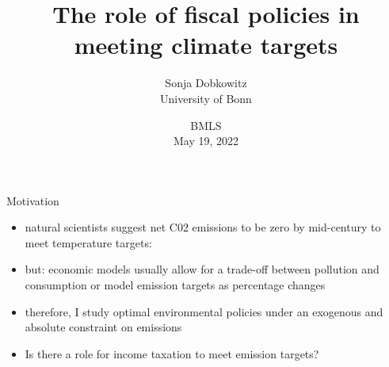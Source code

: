 \documentclass[11pt,aspectratio=169]{beamer}
\author[Sonja Dobkowitz]{\small Sonja Dobkowitz\\ \footnotesize{University of Bonn%
	}\\ }
\institute[University of Bonn]{}
\title{The role of fiscal policies in meeting climate targets}
\date{\small{BMLS\\ May 19, 2022 }}
\newcommand{\ar}{$\Rightarrow$ \ }
\begin{document}
	
	{
		\begin{frame}
		\titlepage
	\end{frame}
}



\begin{frame}{Motivation}

\begin{itemize}[<+-| alert@+>]
\item natural scientists suggest net C02 emissions to be zero by mid-century \citep{Rogelj2018MitigationDevelopment.} to meet temperature targets:
\vspace{3mm}
\item but: economic models usually allow for a trade-off between pollution and consumption or model emission targets as percentage changes %

\vspace{3mm}
\item therefore, I study optimal environmental policies under an exogenous and absolute constraint on emissions
\vspace{3mm}
\item Is there a role for income taxation to meet emission targets?
\end{itemize}
\end{frame}
\end{document}
